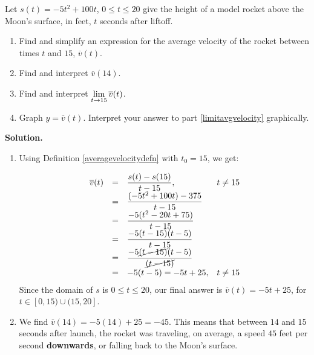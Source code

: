 \begin{ex} \label{averagevelocityrocketex} Let $s(t) = -5t^2+100t$, $0 \leq t \leq 20$ give the height of a model rocket above the Moon's surface, in feet,  $t$ seconds after liftoff.  

\begin{enumerate}

\item  Find and simplify an expression for the average velocity of the rocket between times $t$ and $15$, $\overline{v}(t)$.

\item Find and interpret $\overline{v}(14)$.

\item \label{limitavgvelocity} Find and interpret $\ds{ \lim_{t \rightarrow 15} \overline{v}(t)}$.

\item  Graph $y = \overline{v}(t)$.  Interpret your answer to part \ref{limitavgvelocity} graphically.

\end{enumerate}

{\bf Solution.}

\begin{enumerate}

\item \label{findandsimplifyavgvelocity} Using Definition \ref{averagevelocitydefn} with $t_{0} = 15$, we get: 

\[ \begin{array}{rclr}

 \overline{v}(t) & = & \dfrac{s(t) - s(15)}{t-15} , & \text{$t \neq 15$}  \\
                       & =  & \dfrac{(-5t^2+100t) - 375}{t - 15} &   \\
                        & =  & \dfrac{-5(t^2-20t+75)}{t - 15} &   \\
                        & = & \dfrac{-5(t-15)(t-5)}{t-15} &   \\
                        & = &  \dfrac{-5\cancel{(t-15)} (t-5)}{\cancel{(t-15)}}  & \\
                         & = & -5(t-5) = -5t + 25, & \text{$t \neq 15$} \end{array} \]
Since  the domain of $s$ is  $0 \leq t \leq 20$, our final answer is $\overline{v}(t) = -5t+25$,  for $t \in [0, 15) \cup (15, 20]$. 

\item  We find $\overline{v}(14) = -5(14)+25 = -45$.  This means that between  $14$ and $15$ seconds after launch, the rocket was traveling, on average,  a speed $45$ feet per second \textbf{downwards}, or falling back to the Moon's surface.



\end{enumerate}
\end{ex}
